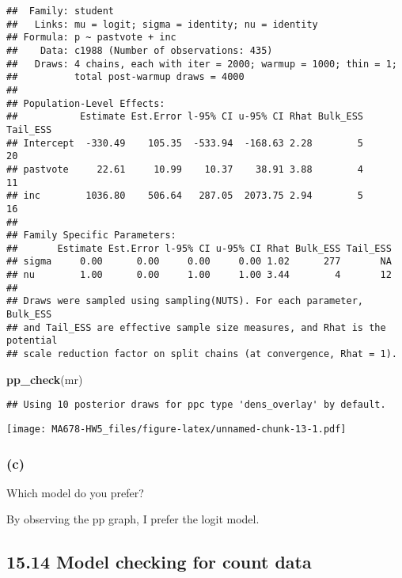 \documentclass[
]{article}
\newenvironment{Shaded}{\begin{snugshade}}{\end{snugshade}}
\newcommand{\FunctionTok}[1]{\textcolor[rgb]{0.13,0.29,0.53}{\textbf{#1}}}
\newcommand{\NormalTok}[1]{#1}
\begin{document}
\begin{verbatim}
##  Family: student 
##   Links: mu = logit; sigma = identity; nu = identity 
## Formula: p ~ pastvote + inc 
##    Data: c1988 (Number of observations: 435) 
##   Draws: 4 chains, each with iter = 2000; warmup = 1000; thin = 1;
##          total post-warmup draws = 4000
## 
## Population-Level Effects: 
##           Estimate Est.Error l-95% CI u-95% CI Rhat Bulk_ESS Tail_ESS
## Intercept  -330.49    105.35  -533.94  -168.63 2.28        5       20
## pastvote     22.61     10.99    10.37    38.91 3.88        4       11
## inc        1036.80    506.64   287.05  2073.75 2.94        5       16
## 
## Family Specific Parameters: 
##       Estimate Est.Error l-95% CI u-95% CI Rhat Bulk_ESS Tail_ESS
## sigma     0.00      0.00     0.00     0.00 1.02      277       NA
## nu        1.00      0.00     1.00     1.00 3.44        4       12
## 
## Draws were sampled using sampling(NUTS). For each parameter, Bulk_ESS
## and Tail_ESS are effective sample size measures, and Rhat is the potential
## scale reduction factor on split chains (at convergence, Rhat = 1).
\end{verbatim}

\begin{Shaded}
\begin{Highlighting}[]
\FunctionTok{pp\_check}\NormalTok{(mr)}
\end{Highlighting}
\end{Shaded}

\begin{verbatim}
## Using 10 posterior draws for ppc type 'dens_overlay' by default.
\end{verbatim}

\texttt{[image: MA678-HW5\_files/figure-latex/unnamed-chunk-13-1.pdf]}

\hypertarget{c-2}{%
\subsubsection{(c)}\label{c-2}}

Which model do you prefer?

By observing the pp graph, I prefer the logit model.

\hypertarget{model-checking-for-count-data}{%
\subsection{15.14 Model checking for count
data}\label{model-checking-for-count-data}}
\end{document}
